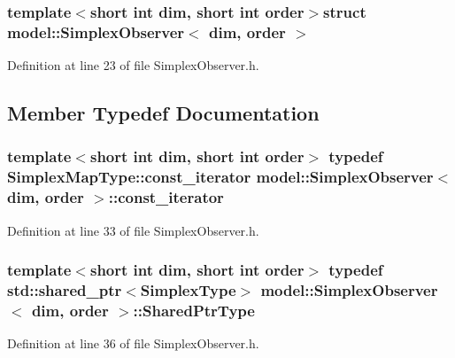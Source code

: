 \subsubsection*{template$<$short int dim, short int order$>$struct model\+::\+Simplex\+Observer$<$ dim, order $>$}



Definition at line 23 of file Simplex\+Observer.\+h.



\subsection{Member Typedef Documentation}
\hypertarget{structmodel_1_1_simplex_observer_ad8c54de1bc215fcd2e8ac226fd69fe5c}{}
\subsubsection[{const\+\_\+iterator}]{\setlength{\rightskip}{0pt plus 5cm}template$<$short int dim, short int order$>$ typedef Simplex\+Map\+Type\+::const\+\_\+iterator {\bf model\+::\+Simplex\+Observer}$<$ {\bf dim}, order $>$\+::{\bf const\+\_\+iterator}}\label{structmodel_1_1_simplex_observer_ad8c54de1bc215fcd2e8ac226fd69fe5c}


Definition at line 33 of file Simplex\+Observer.\+h.

\hypertarget{structmodel_1_1_simplex_observer_a8e2b7dce7a23bc6c4cdf87b7d606ca2b}{}
\subsubsection[{Shared\+Ptr\+Type}]{\setlength{\rightskip}{0pt plus 5cm}template$<$short int dim, short int order$>$ typedef std\+::shared\+\_\+ptr$<${\bf Simplex\+Type}$>$ {\bf model\+::\+Simplex\+Observer}$<$ {\bf dim}, order $>$\+::{\bf Shared\+Ptr\+Type}}\label{structmodel_1_1_simplex_observer_a8e2b7dce7a23bc6c4cdf87b7d606ca2b}


Definition at line 36 of file Simplex\+Observer.\+h.

\hypertarget{structmodel_1_1_simplex_observer_a270d41a2f2b7393f03651f9900b62c0b}{}
